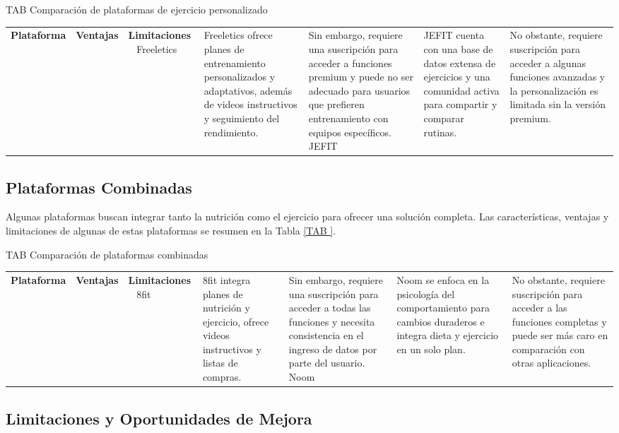 \begin{table}[Plataformas de Ejercicio Personalizado]{TAB
}{Comparación de plataformas de ejercicio personalizado}
\begin{tabular}{|p{3cm}|p{5cm}|p{5cm}|}
\hline
\textbf{Plataforma} & \textbf{Ventajas} & \textbf{Limitaciones} \
\hline
Freeletics & Freeletics ofrece planes de entrenamiento personalizados y adaptativos, además de videos instructivos y seguimiento del rendimiento. & Sin embargo, requiere una suscripción para acceder a funciones premium y puede no ser adecuado para usuarios que prefieren entrenamiento con equipos específicos. \
\hline
JEFIT & JEFIT cuenta con una base de datos extensa de ejercicios y una comunidad activa para compartir y comparar rutinas. & No obstante, requiere suscripción para acceder a algunas funciones avanzadas y la personalización es limitada sin la versión premium. \
\hline
\end{tabular}
\end{table}

\subsection{Plataformas Combinadas}

Algunas plataformas buscan integrar tanto la nutrición como el ejercicio para ofrecer una solución completa. Las características, ventajas y limitaciones de algunas de estas plataformas se resumen en la Tabla \ref{TAB
}.

\begin{table}[Plataformas Combinadas]{TAB
}{Comparación de plataformas combinadas}
\begin{tabular}{|p{3cm}|p{5cm}|p{5cm}|}
\hline
\textbf{Plataforma} & \textbf{Ventajas} & \textbf{Limitaciones} \
\hline
8fit & 8fit integra planes de nutrición y ejercicio, ofrece videos instructivos y listas de compras. & Sin embargo, requiere una suscripción para acceder a todas las funciones y necesita consistencia en el ingreso de datos por parte del usuario. \
\hline
Noom & Noom se enfoca en la psicología del comportamiento para cambios duraderos e integra dieta y ejercicio en un solo plan. & No obstante, requiere suscripción para acceder a las funciones completas y puede ser más caro en comparación con otras aplicaciones. \
\hline
\end{tabular}
\end{table}

\subsection{Limitaciones y Oportunidades de Mejora}

